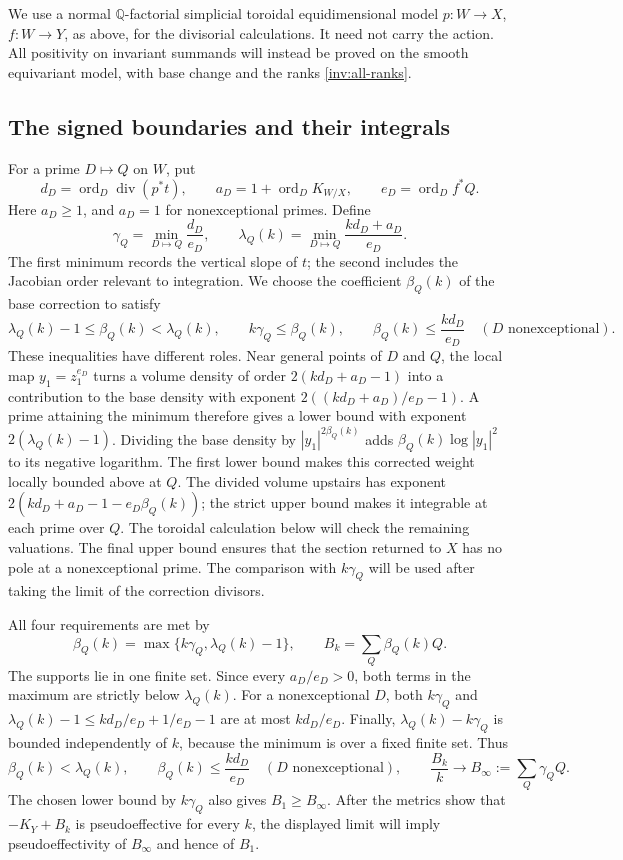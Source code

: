 We use a normal $\mathbb Q$-factorial simplicial toroidal
equidimensional model $p:W\to X$, $f:W\to Y$, as above, for the
divisorial calculations.  It need not carry the action.  All positivity
on invariant summands will instead be proved on the smooth equivariant
model, with base change and the ranks \eqref{inv:all-ranks}.

\subsection{The signed boundaries and their integrals}

For a prime $D\mapsto Q$ on $W$, put
\[
 d_D=\operatorname{ord}_D\operatorname{div}(p^*t),\qquad
 a_D=1+\operatorname{ord}_D K_{W/X},\qquad
 e_D=\operatorname{ord}_D f^*Q.
\]
Here $a_D\ge1$, and $a_D=1$ for nonexceptional primes.  Define
\[
 \gamma_Q=\min_{D\mapsto Q}\frac{d_D}{e_D},\qquad
 \lambda_Q(k)=\min_{D\mapsto Q}\frac{kd_D+a_D}{e_D}.
\]
The first minimum records the vertical slope of $t$; the second
includes the Jacobian order relevant to integration.  We choose the
coefficient $\beta_Q(k)$ of the base correction to satisfy
\[
 \lambda_Q(k)-1\le\beta_Q(k)<\lambda_Q(k),\qquad
 k\gamma_Q\le\beta_Q(k),\qquad
 \beta_Q(k)\le\frac{kd_D}{e_D}
        \quad(D\text{ nonexceptional}).
\]
These inequalities have different roles.  Near general points of
$D$ and $Q$, the local map $y_1=z_1^{e_D}$ turns a volume density
of order $2(kd_D+a_D-1)$ into a contribution to the base density
with exponent $2((kd_D+a_D)/e_D-1)$.  A prime attaining the minimum
therefore gives a lower bound with exponent $2(\lambda_Q(k)-1)$.
Dividing the base density by $|y_1|^{2\beta_Q(k)}$ adds
$\beta_Q(k)\log|y_1|^2$ to its negative logarithm.  The first
lower bound makes this corrected weight locally bounded above at $Q$.
The divided volume upstairs has exponent
$2(kd_D+a_D-1-e_D\beta_Q(k))$; the strict upper bound makes it
integrable at each prime over $Q$.  The toroidal calculation below
will check the remaining valuations.  The final upper bound ensures
that the section returned to $X$ has no pole at a nonexceptional
prime.  The comparison with $k\gamma_Q$ will be used after taking
the limit of the correction divisors.

All four requirements are met by
\[
 \beta_Q(k)=\max\{k\gamma_Q,\lambda_Q(k)-1\},\qquad
 B_k=\sum_Q\beta_Q(k)Q.
\]
The supports lie in one finite set.  Since every $a_D/e_D>0$,
both terms in the maximum are strictly below $\lambda_Q(k)$.
For a nonexceptional $D$, both $k\gamma_Q$ and
$\lambda_Q(k)-1\le kd_D/e_D+1/e_D-1$ are at most $kd_D/e_D$.
Finally, $\lambda_Q(k)-k\gamma_Q$ is bounded independently of $k$,
because the minimum is over a fixed finite set.  Thus
\begin{equation}\label{inv:beta-bounds}
 \beta_Q(k)<\lambda_Q(k),\qquad
 \beta_Q(k)\le\frac{kd_D}{e_D}\quad(D\text{ nonexceptional}),
 \qquad \frac{B_k}{k}\longrightarrow
 B_\infty:=\sum_Q\gamma_QQ.
\end{equation}
The chosen lower bound by $k\gamma_Q$ also gives $B_1\ge B_\infty$.
After the metrics show that $-K_Y+B_k$ is pseudoeffective for every
$k$, the displayed limit will imply pseudoeffectivity of $B_\infty$
and hence of $B_1$.

